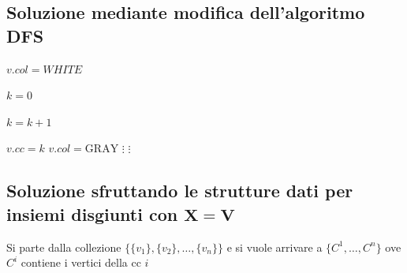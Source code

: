 \subsection{Soluzione mediante modifica dell'algoritmo DFS}
\begin{minipage}{0.45\textwidth}
    \begin{algorithmic}
                \State $v.col=WHITE$
            \EndFor

            \State $k=0$

                    \State $k=k+1$
                    \State {}
                \EndIf
            \EndFor
        \EndProcedure
    \end{algorithmic}
\end{minipage}
\hfill
\begin{minipage}{0.45\textwidth}
    \begin{algorithmic}
            \State $\boxed{v.cc = k}$
            \State $v.col = \text{GRAY}$
            \State $\vdots$
                \State $\vdots$
                \State {}
            \EndFor
        \EndProcedure
    \end{algorithmic}
\end{minipage}

\subsection{Soluzione sfruttando le strutture dati per insiemi disgiunti con $\mathbf{X=V}$}

Si parte dalla collezione $\{\{v_1\},\{v_2\}, \dots, \{v_n\}\}$ e si vuole arrivare a $\{C^1, \dots, C^n\}$ ove $C^i$ contiene i vertici della cc $i$

